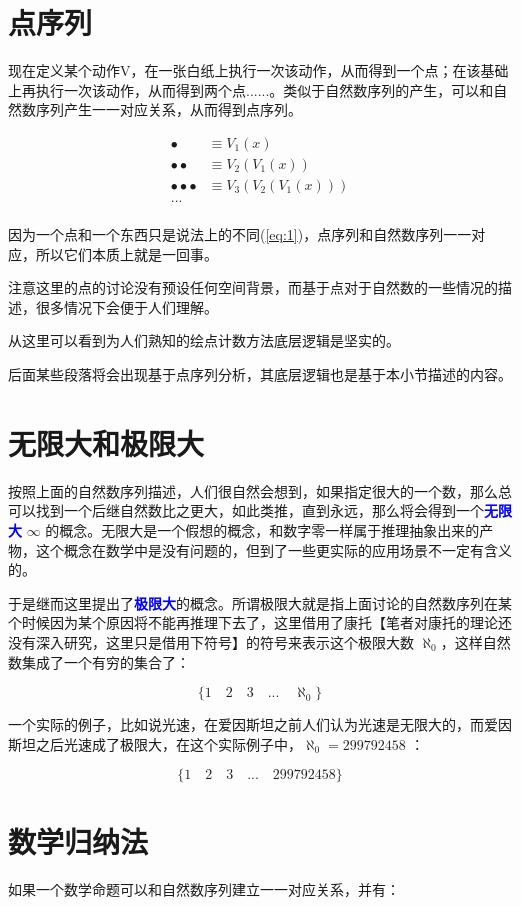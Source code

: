 \documentclass[12pt,oneside]{book}
\renewcommand{\emph}[1]{\textcolor{blue}{\textbf{#1}}}
\begin{document}
\section{点序列}
现在定义某个动作V，在一张白纸上执行一次该动作，从而得到一个点；在该基础上再执行一次该动作，从而得到两个点......。类似于自然数序列的产生，可以和自然数序列产生一一对应关系，从而得到点序列。


\begin{align*}
\bullet &\equiv V_1(x) \\
\bullet \bullet&\equiv V_2(V_1(x)) \\
\bullet \bullet \bullet &\equiv V_3(V_2(V_1(x))) \\
...\\
\end{align*}



因为一个点和一个东西只是说法上的不同(\ref{eq:1})，点序列和自然数序列一一对应，所以它们本质上就是一回事。

注意这里的点的讨论没有预设任何空间背景，而基于点对于自然数的一些情况的描述，很多情况下会便于人们理解。

从这里可以看到为人们熟知的绘点计数方法底层逻辑是坚实的。

后面某些段落将会出现基于点序列分析，其底层逻辑也是基于本小节描述的内容。

\section{无限大和极限大}
按照上面的自然数序列描述，人们很自然会想到，如果指定很大的一个数，那么总可以找到一个后继自然数比之更大，如此类推，直到永远，那么将会得到一个\emph{无限大} $\infty$ 的概念。无限大是一个假想的概念，和数字零一样属于推理抽象出来的产物，这个概念在数学中是没有问题的，但到了一些更实际的应用场景不一定有含义的。

于是继而这里提出了\emph{极限大}的概念。所谓极限大就是指上面讨论的自然数序列在某个时候因为某个原因将不能再推理下去了，这里借用了康托【笔者对康托的理论还没有深入研究，这里只是借用下符号】的符号来表示这个极限大数 $\aleph_0$，这样自然数集成了一个有穷的集合了：

\[
\{1 \quad 2 \quad 3 \quad  ...  \quad \aleph_0\}
\]

一个实际的例子，比如说光速，在爱因斯坦之前人们认为光速是无限大的，而爱因斯坦之后光速成了极限大，在这个实际例子中，$\aleph_0=299792458$ ：

\[
\{1 \quad 2 \quad 3 \quad  ...  \quad 299792458\}
\]


\section{数学归纳法}
如果一个数学命题可以和自然数序列建立一一对应关系，并有：
\end{document}

